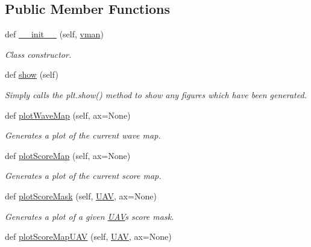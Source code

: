 \subsection*{Public Member Functions}
\begin{DoxyCompactItemize}
\item 
def \mbox{\hyperlink{classpath_plan_1_1_path_planner_a4725d91c2d54372bbfecfce0a71a3552}{\+\_\+\+\_\+init\+\_\+\+\_\+}} (self, \mbox{\hyperlink{classpath_plan_1_1_path_planner_a8e31f83f0d8983286bb3746da568af81}{vman}})
\begin{DoxyCompactList}\small\item\em Class constructor. \end{DoxyCompactList}\item 
def \mbox{\hyperlink{classpath_plan_1_1_path_planner_ac2b91da25e1f81aa210e83d502f9a008}{show}} (self)
\begin{DoxyCompactList}\small\item\em Simply calls the plt.\+show() method to show any figures which have been generated. \end{DoxyCompactList}\item 
def \mbox{\hyperlink{classpath_plan_1_1_path_planner_ad0aac3259a17970adbb7652d32365f44}{plot\+Wave\+Map}} (self, ax=None)
\begin{DoxyCompactList}\small\item\em Generates a plot of the current wave map. \end{DoxyCompactList}\item 
def \mbox{\hyperlink{classpath_plan_1_1_path_planner_abe0f6150b91e41dc9625d29a7005e37d}{plot\+Score\+Map}} (self, ax=None)
\begin{DoxyCompactList}\small\item\em Generates a plot of the current score map. \end{DoxyCompactList}\item 
def \mbox{\hyperlink{classpath_plan_1_1_path_planner_a6e74d35801d637631580333ea9210aa5}{plot\+Score\+Mask}} (self, \mbox{\hyperlink{classpath_plan_1_1_u_a_v}{U\+AV}}, ax=None)
\begin{DoxyCompactList}\small\item\em Generates a plot of a given \mbox{\hyperlink{classpath_plan_1_1_u_a_v}{U\+AV}}\textquotesingle{}s score mask. \end{DoxyCompactList}\item 
def \mbox{\hyperlink{classpath_plan_1_1_path_planner_aa5506bc585bd5f1d3fa76d0e383b0cc2}{plot\+Score\+Map\+U\+AV}} (self, \mbox{\hyperlink{classpath_plan_1_1_u_a_v}{U\+AV}}, ax=None)

\end{DoxyCompactItemize}

